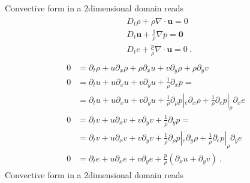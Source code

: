 \documentclass[letterpaper,10pt,english]{jupyterBook}
\begin{document}
\sphinxAtStartPar
Convective form in a 2\sphinxhyphen{}dimensional domain reads
\begin{equation*}
\begin{split}\begin{aligned}
  & D_t \rho + \rho \nabla \cdot \mathbf{u} = 0 \\
  & D_t \mathbf{u} + \frac{1}{\rho} \nabla p = \mathbf{0} \\
  & D_t e + \frac{p}{\rho} \nabla \cdot \mathbf{u} = 0 \ .
\end{aligned}\end{split}
\end{equation*}\begin{equation*}
\begin{split}\begin{aligned}
  0 & = \partial_t \rho + u \partial_x \rho + \rho \partial_x u + v \partial_y \rho + \rho \partial_y v \\ 
  0 & = \partial_t u + u \partial_x u + v \partial_y u + \frac{1}{\rho}\partial_x p = \\
    & = \partial_t u + u \partial_x u + v \partial_y u + \frac{1}{\rho}\partial_\rho p|_e \partial_x \rho + \frac{1}{\rho}\partial_e p|_\rho \partial_x e \\
  0 & = \partial_t v + u \partial_x v + v \partial_y v + \frac{1}{\rho}\partial_y p = \\
    & = \partial_t v + u \partial_x v + v \partial_y v + \frac{1}{\rho}\partial_\rho p|_e \partial_y \rho + \frac{1}{\rho}\partial_e p|_\rho \partial_y e \\
  0 & = \partial_t e + u \partial_x e + v \partial_y e + \frac{p}{\rho}\left( \partial_x u + \partial_y v \right) \ .
\end{aligned}\end{split}
\end{equation*}
\sphinxAtStartPar
Convective form in a 2\sphinxhyphen{}dimensional domain reads
\end{document}
